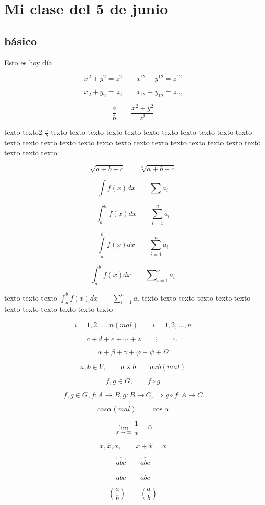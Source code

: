 \documentclass[12pt,a4paper]{report}
\numberwithin{equation}{section}
\begin{document}
\chapter{Mi clase del 5 de junio}

\section{básico}
Esto es hoy día

$$
x^2+y^2=z^2\qquad x^{12}+y^{12}=z^{12}
$$

$$
x_2+y_2=z_2\qquad x_{12}+y_{12}=z_{12}
$$

$$
\frac{a}{b}\qquad\frac{x^2+y^2}{z^2}
$$

texto texto2 $\frac{a}{b}$ texto texto texto texto texto texto texto texto texto texto texto texto texto texto texto texto texto texto texto texto texto texto texto texto texto texto texto texto

$$
\sqrt{a+b+c}\qquad \sqrt[n]{a+b+c}
$$

$$
\int f(x)dx \qquad \sum a_i
$$


$$
\int_{a}^{b} f(x)dx \qquad \sum_{i=1}^n a_i
$$

$$
\int\limits_{a}^{b} f(x)dx \qquad \sum_{i=1}^n a_i
$$

$$
\int_{a}^{b} f(x)dx \qquad \sum\nolimits_{i=1}^n a_i
$$

texto texto texto  $\int_{a}^{b} f(x)dx \qquad \sum_{i=1}^n a_i$ texto texto texto texto  texto texto  texto texto  texto texto  texto texto

$$
i=1,2,...,n (mal)\qquad i=1,2,\ldots,n
$$ 

$$
c+d+e+\cdots+z\qquad \vdots\qquad \ddots
$$

$$
\alpha+\beta+\gamma+\varphi+\psi+\Omega
$$

$$
a,b \in V,\qquad a\times b\qquad axb(mal)
$$

$$
f,g\in G ,\qquad f\circ g
$$

$$
f,g \in G, f:A\to B, g:B\longrightarrow C, \Longrightarrow g\circ f:A\rightarrow C
$$

$$
cos\alpha (mal) \qquad \cos\alpha 
$$

$$
\lim_{x\to\infty}\frac{1}{x}=0
$$

$$
x,\hat{x},\tilde{x},\qquad x+\hat{x}=\tilde{x}
$$

$$
\hat{abc}\qquad \widehat{abc}
$$

$$
\tilde{abc}\qquad \widetilde{abc}
$$

$$
(\frac{a}{b})\qquad \left(\frac{a}{b}\right)
$$
\end{document}
